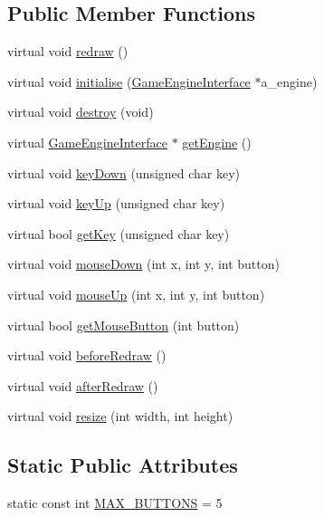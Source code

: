 \subsection*{Public Member Functions}
\begin{DoxyCompactItemize}
\item 
virtual void \hyperlink{classSplashWindow_aad27778951eb9dd5dbb03635f2bda114}{redraw} ()
\item 
virtual void \hyperlink{classWindow_a3dcd22169bd4d40f4b35eafdea31f6dd}{initialise} (\hyperlink{classGameEngineInterface}{Game\-Engine\-Interface} $\ast$a\-\_\-engine)
\item 
virtual void \hyperlink{classWindow_ae0ed7fd17df30f2d262cb684560e0469}{destroy} (void)
\item 
virtual \hyperlink{classGameEngineInterface}{Game\-Engine\-Interface} $\ast$ \hyperlink{classWindow_a55a6e31e36665bd3bcffcd844f5f0385}{get\-Engine} ()
\item 
virtual void \hyperlink{classWindow_a25a5308909ec422bebb480c803e1233c}{key\-Down} (unsigned char key)
\item 
virtual void \hyperlink{classWindow_a249f5a9513be00e59428a1df37502c63}{key\-Up} (unsigned char key)
\item 
virtual bool \hyperlink{classWindow_ac0927d0b89776959c4a95dd6737f841f}{get\-Key} (unsigned char key)
\item 
virtual void \hyperlink{classWindow_ace3bd5e6614510fce97263eccc35c0ab}{mouse\-Down} (int x, int y, int button)
\item 
virtual void \hyperlink{classWindow_a2e2c7592975405513a05a2da6a512b1c}{mouse\-Up} (int x, int y, int button)
\item 
virtual bool \hyperlink{classWindow_ab824bd52a5a055e468f7b2cc3d0b4f54}{get\-Mouse\-Button} (int button)
\item 
virtual void \hyperlink{classWindow_a1344118a395cb2fc48d4a2359372b074}{before\-Redraw} ()
\item 
virtual void \hyperlink{classWindow_a05b1d6673e37db442ecd80c54d10e6b7}{after\-Redraw} ()
\item 
virtual void \hyperlink{classWindow_a6e4274c73728009132b7e0dfad42a8de}{resize} (int width, int height)
\end{DoxyCompactItemize}
\subsection*{Static Public Attributes}
\begin{DoxyCompactItemize}
\item 
static const int \hyperlink{classWindow_a78a36ba2259fdd12ad2cf3346430fb35}{M\-A\-X\-\_\-\-B\-U\-T\-T\-O\-N\-S} = 5
\end{DoxyCompactItemize}


